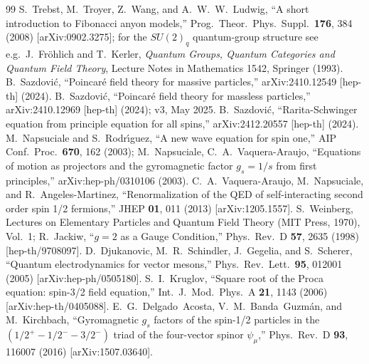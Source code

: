 \documentclass[twocolumn,aps,prd,floatfix,nofootinbib,superscriptaddress,10pt]{article}
\begin{document}
\begin{thebibliography}{99}
 S.~Trebst, M.~Troyer, Z.~Wang, and A.~W.~W.~Ludwig, ``A short introduction to Fibonacci anyon models,'' Prog.\ Theor.\ Phys.\ Suppl.\ \textbf{176}, 384 (2008) [arXiv:0902.3275]; for the $SU(2)_q$ quantum-group structure see e.g.\ J.~Fr\"ohlich and T.~Kerler, \emph{Quantum Groups, Quantum Categories and Quantum Field Theory}, Lecture Notes in Mathematics 1542, Springer (1993).
 B.~Sazdovi\'c, ``Poincar\'e field theory for massive particles,'' arXiv:2410.12549 [hep-th] (2024).
 B.~Sazdovi\'c, ``Poincar\'e field theory for massless particles,'' arXiv:2410.12969 [hep-th] (2024); v3, May 2025.
 B.~Sazdovi\'c, ``Rarita-Schwinger equation from principle equation for all spins,'' arXiv:2412.20557 [hep-th] (2024).
 M.~Napsuciale and S.~Rodr\'\i guez, ``A new wave equation for spin one,'' AIP Conf.\ Proc.\ \textbf{670}, 162 (2003); M.~Napsuciale, C.~A.~Vaquera-Araujo, ``Equations of motion as projectors and the gyromagnetic factor $g_s=1/s$ from first principles,'' arXiv:hep-ph/0310106 (2003).
 C.~A.~Vaquera-Araujo, M.~Napsuciale, and R.~Angeles-Martinez, ``Renormalization of the QED of self-interacting second order spin 1/2 fermions,'' JHEP \textbf{01}, 011 (2013) [arXiv:1205.1557].
 S.~Weinberg, Lectures on Elementary Particles and Quantum Field Theory (MIT Press, 1970), Vol.~1; R.~Jackiw, ``$g=2$ as a Gauge Condition,'' Phys.\ Rev.\ D \textbf{57}, 2635 (1998) [hep-th/9708097].
 D.~Djukanovic, M.~R.~Schindler, J.~Gegelia, and S.~Scherer, ``Quantum electrodynamics for vector mesons,'' Phys.\ Rev.\ Lett.\ \textbf{95}, 012001 (2005) [arXiv:hep-ph/0505180].
 S.~I.~Kruglov, ``Square root of the Proca equation: spin-3/2 field equation,'' Int.\ J.\ Mod.\ Phys.\ A \textbf{21}, 1143 (2006) [arXiv:hep-th/0405088].
 E.~G.~Delgado~Acosta, V.~M.~Banda~Guzm\'an, and M.~Kirchbach, ``Gyromagnetic $g_s$ factors of the spin-1/2 particles in the $(1/2^+\!-\!1/2^-\!-\!3/2^-)$ triad of the four-vector spinor $\psi_\mu$,'' Phys.\ Rev.\ D \textbf{93}, 116007 (2016) [arXiv:1507.03640].


\end{thebibliography}
\end{document}
